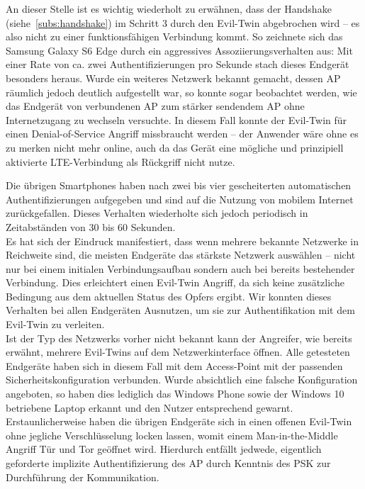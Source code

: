 An dieser Stelle ist es wichtig wiederholt zu erwähnen, dass der Handshake (siehe~\ref{subs:handshake}) im Schritt 3 durch den Evil-Twin abgebrochen wird -- es also nicht zu einer funktionsfähigen Verbindung kommt.
So zeichnete sich das Samsung Galaxy S6 Edge durch ein aggressives Assoziierungsverhalten aus: Mit einer Rate von ca. zwei Authentifizierungen pro Sekunde stach dieses Endgerät besonders heraus.
Wurde ein weiteres Netzwerk bekannt gemacht, dessen AP räumlich jedoch deutlich aufgestellt war, so konnte sogar beobachtet werden, wie das Endgerät von verbundenen AP zum stärker sendendem AP ohne Internetzugang zu wechseln versuchte. 
In diesem Fall konnte der Evil-Twin für einen Denial-of-Service Angriff missbraucht werden -- der Anwender wäre ohne es zu merken nicht mehr online, auch da das Gerät eine mögliche und prinzipiell aktivierte LTE-Verbindung als Rückgriff nicht nutze.

Die übrigen Smartphones haben nach zwei bis vier gescheiterten automatischen Authentifizierungen aufgegeben und sind auf die Nutzung von mobilem Internet zurückgefallen.
Dieses Verhalten wiederholte sich jedoch periodisch in Zeitabständen von 30 bis 60 Sekunden.\\

Es hat sich der Eindruck manifestiert, dass wenn mehrere bekannte Netzwerke in Reichweite sind, die meisten Endgeräte das stärkste Netzwerk auswählen -- nicht nur bei einem initialen Verbindungsaufbau sondern auch bei bereits bestehender Verbindung. Dies erleichtert einen Evil-Twin Angriff, da sich keine zusätzliche Bedingung aus dem aktuellen Status des Opfers ergibt.
Wir konnten dieses Verhalten bei allen Endgeräten Ausnutzen, um sie zur Authentifikation mit dem Evil-Twin zu verleiten.\\

Ist der Typ des Netzwerks vorher nicht bekannt kann der Angreifer, wie bereits erwähnt, mehrere Evil-Twins auf dem Netzwerkinterface öffnen.
Alle getesteten Endgeräte haben sich in diesem Fall mit dem Access-Point mit der passenden Sicherheitskonfiguration verbunden.
Wurde absichtlich eine falsche Konfiguration angeboten, so haben dies lediglich das Windows Phone sowie der Windows 10 betriebene Laptop erkannt und den Nutzer entsprechend gewarnt. %
Erstaunlicherweise haben die übrigen Endgeräte sich in einen offenen Evil-Twin ohne jegliche Verschlüsselung locken lassen, womit einem Man-in-the-Middle Angriff Tür und Tor geöffnet wird. Hierdurch entfällt jedwede, eigentlich geforderte implizite Authentifizierung des AP durch Kenntnis des PSK zur Durchführung der Kommunikation.\\


